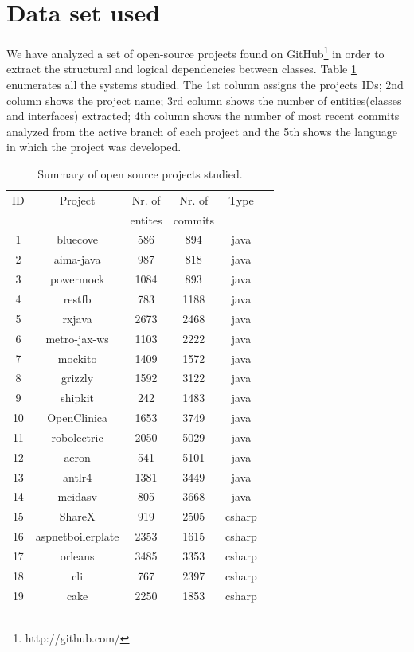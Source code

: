 \documentclass[12pt]{mitthesis}
\begin{document}
\section{Data set used}
\label{sec:dataset}
We have analyzed a set of open-source projects found on GitHub\footnote{http://github.com/} \cite{Kalliamvakou2016} in order to extract the structural and logical dependencies between classes. Table \ref{table:1} enumerates all the systems studied. The 1st column assigns the projects IDs; 2nd column shows the project name; 3rd column shows the number of entities(classes and interfaces) extracted; 4th column shows the number of most recent commits analyzed from the active branch of each project and the 5th shows the language in which the project was developed.
\begin{table}[H]
\caption{Summary of open source projects studied.}
\label{table:1}
\centering
\begin{tabular}{|c|c|c|c|c|c|}
\hline
   ID  & Project    & Nr. of & Nr. of& Type\\
     &     & entites & commits & \\
\hline
1	&	bluecove	&	586	&	894	&	java	\\
2	&	aima-java	&	987	&	818	&	java	\\
3	&	powermock	&	1084	&	893	&	java	\\
4	&	restfb	&	783	&	1188	&	java	\\
5	&	rxjava	&	2673	&	2468	&	java	\\
6	&	metro-jax-ws	&	1103	&	2222	&	java	\\
7	&	mockito	&	1409	&	1572	&	java	\\
8	&	grizzly	&	1592	&	3122	&	java	\\
9	&	shipkit	&	242	&	1483	&	java	\\
10	&	OpenClinica	&	1653	&	3749	&	java	\\
11	&	robolectric	&	2050	&	5029	&	java	\\
12	&	aeron	&	541	&	5101	&	java	\\
13	&	antlr4	&	1381	&	3449	&	java	\\
14	&	mcidasv	&	805	&	3668	&	java	\\
15	&	ShareX	&	919	&	2505	&	csharp	\\
16	&	aspnetboilerplate	&	2353	&	1615	&	csharp	\\
17	&	orleans	&	3485	&	3353	&	csharp	\\
18	&	cli	&	767	&	2397	&	csharp	\\
19	&	cake	&	2250	&	1853	&	csharp	\\

\end{tabular}
\end{table}
\end{document}
